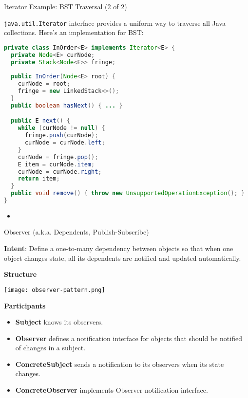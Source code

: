 \documentclass{beamer}
\begin{document}
\begin{frame}[fragile]{Iterator Example: BST Traversal (2 of 2)}

\vspace{-.05in}
{\tt java.util.Iterator} interface provides a uniform way to traverse all Java collections.  Here's an implementation for BST:
\vspace{-.1in}
\begin{lstlisting}[language=Java]
private class InOrder<E> implements Iterator<E> {
  private Node<E> curNode;
  private Stack<Node<E>> fringe;
  
  public InOrder(Node<E> root) {
    curNode = root;
    fringe = new LinkedStack<>();
  }
  public boolean hasNext() { ... }

  public E next() {
    while (curNode != null) {
      fringe.push(curNode);
      curNode = curNode.left;
    }
    curNode = fringe.pop();
    E item = curNode.item;
    curNode = curNode.right;
    return item;
  }        
  public void remove() { throw new UnsupportedOperationException(); }
}
\end{lstlisting}

\begin{itemize}
\item
\end{itemize}


\end{frame}

\begin{frame}[fragile]{Observer (a.k.a. Dependents, Publish-Subscribe)}

\vspace{-.05in}
{\bf Intent}: Define a one-to-many dependency between objects so that when one object changes state, all its dependents are notified and updated automatically.

{\bf Structure}
\vspace{-.15in}
\begin{center}
\texttt{[image: observer-pattern.png]}\\
\end{center}
\vspace{-.15in}
{\bf Participants}
\begin{itemize}
\item {\bf Subject} knows its observers.
\item {\bf Observer} defines a notification interface for objects that should be notified of changes in a subject.
\item {\bf ConcreteSubject} sends a notification to its observers when its state changes.
\item {\bf ConcreteObserver} implements Observer notification interface.
\end{itemize}


\end{frame}
\end{document}
